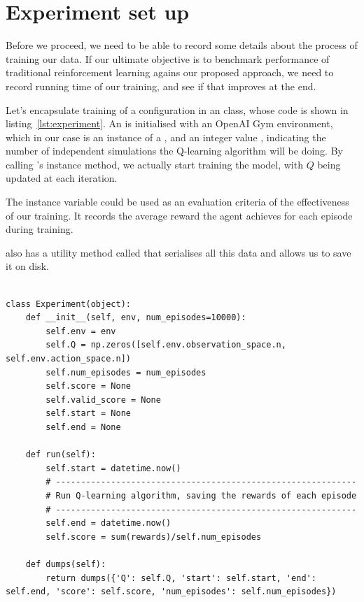 
\section{Experiment set up}
Before we proceed, we need to be able to record some details about the process of training our data. If our ultimate objective is to benchmark performance of traditional reinforcement learning agains our proposed approach, we need to record running time of our training, and see if that improves at the end. 

Let's encapsulate training of a configuration in an  class, whose code is shown in listing~\ref{lst:experiment}. An  is initialised with an OpenAI Gym environment, which in our case is an instance of a , and an integer value , indicating the number of independent simulations the Q-learning algorithm will be doing. By calling 's  instance method, we actually start training the model, with $Q$ being updated at each iteration.

The instance variable  could be used as an evaluation criteria of the effectiveness of our training. It records the average reward the agent achieves for each episode during training.

 also has a utility method called  that serialises all this data and allows us to save it on disk.
\\\\
\begin{minipage}{\linewidth}
\lstset{language=Python}
\lstset{frame=lines}
\lstset{basicstyle=\footnotesize}
\begin{lstlisting}
class Experiment(object):
    def __init__(self, env, num_episodes=10000):
        self.env = env
        self.Q = np.zeros([self.env.observation_space.n, self.env.action_space.n])
        self.num_episodes = num_episodes
        self.score = None
        self.valid_score = None
        self.start = None
        self.end = None
            
    def run(self):
        self.start = datetime.now()
        # ------------------------------------------------------------
        # Run Q-learning algorithm, saving the rewards of each episode
        # ------------------------------------------------------------
        self.end = datetime.now()
        self.score = sum(rewards)/self.num_episodes
        
    def dumps(self):
        return dumps({'Q': self.Q, 'start': self.start, 'end': self.end, 'score': self.score, 'num_episodes': self.num_episodes})
\end{lstlisting}
\end{minipage}


